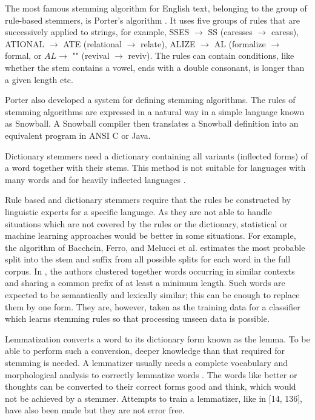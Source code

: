 \documentclass[11pt,openany,executivepaper]{book}
\begin{document}
The most famous stemming algorithm for English text, belonging to the group of rule-based stemmers, is Porter's algorithm \cite{217}. It uses five groups of rules that are successively applied to strings, for example, SSES $\rightarrow$ SS (caresses $\rightarrow$ caress), ATIONAL $\rightarrow$ ATE (relational $\rightarrow$ relate), ALIZE $\rightarrow$ AL (formalize $\rightarrow$ formal, or $A L \rightarrow$ "" (revival $\rightarrow$ reviv). The rules can contain conditions, like whether the stem contains a vowel, ends with a double consonant, is longer than a given length etc.

Porter \cite{218} also developed a system for defining stemming algorithms. The rules of stemming algorithms are expressed in a natural way in a simple language known as Snowball. A Snowball compiler then translates a Snowball definition into an equivalent program in ANSI C or Java.

Dictionary stemmers need a dictionary containing all variants (inflected forms) of a word together with their stems. This method is not suitable for languages with many words and for heavily inflected languages \cite{140}.

Rule based and dictionary stemmers require that the rules be constructed by linguistic experts for a specific language. As they are not able to handle situations which are not covered by the rules or the dictionary, statistical or machine learning approaches would be better in some situations. For example, the algorithm of Bacchcin, Ferro, and Melucci et al. \cite{15} estimates the most probable split into the stem and suffix from all possible splits for each word in the full corpus. In \cite{39}, the authors clustered together words occurring in similar contexts and sharing a common prefix of at least a minimum length. Such words are expected to be semantically and lexically similar; this can be enough to replace them by one form. They are, however, taken as the training data for a classifier which learns stemming rules so that processing unseen data is possible.
\begin{sloppypar}  
Lemmatization converts a word to its dictionary form known as the lemma. To be able to perform such a conversion, deeper knowledge than that required for stemming is needed. A lemmatizer usually needs a complete vocabulary and morphological analysis to correctly lemmatize words \cite{185}. The words like better or thoughts can be converted to their correct forms good and think, which would not be achieved by a stemmer. Attempts to train a lemmatizer, like in [14, 136], have also been made but they are not error free.
\end{sloppypar}
\end{document}
